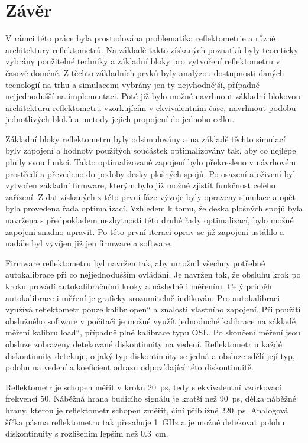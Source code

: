 \chapter{Závěr}

V rámci této práce byla prostudována problematika reflektometrie a různé architektury reflektometrů. Na základě takto získaných poznatků byly teoreticky vybrány použitelné techniky a základní bloky pro vytvoření reflektometru v časové doméně. Z těchto základních prvků byly analýzou dostupnosti daných tecnologií na trhu a simulacemi vybrány jen ty nejvhodnější, případně nejjednodušší na implementaci. Poté již bylo možné navrhnout základní blokovou architekturu reflektometru vzorkujícím v ekvivalentním čase, navrhnout podobu jednotlivých bloků a metody jejich propojení do jednoho celku. 

Základní bloky reflektometru byly odsimulovány a na základě těchto simulací byly zapojení a hodnoty použitých součástek optimalizovány tak, aby co nejlépe plnily svou funkci. Takto optimalizované zapojení bylo překresleno v návrhovém prostředí a převedeno do podoby desky plošných spojů. Po osazení a oživení byl vytvořen základní firmware, kterým bylo již možné zjistit funkčnost celého zařízení. Z dat získaných z této první fáze vývoje byly opraveny simulace a opět byla provedena řada optimalizací. Vzhledem k tomu, že deska plošných spojů byla navržena s předpokladem nezbytnosti této druhé řady optimalizací, bylo možné zapojení snadno upravit. Po této první iteraci oprav se již zapojení ustálilo a nadále byl vyvíjen již jen firmware a software.

Firmware reflektometru byl navržen tak, aby umožnil všechny potřebné autokalibrace při co nejjednodušším ovládání. Je navržen tak, že obsluhu krok po kroku provádí autokalibračními kroky a následně i měřením. Celý průběh autokalibrace i měření je graficky srozumitelně indikován. Pro autokalibraci využívá reflektometr pouze kalibr \quotedblbase open\textquotedblleft{} a znalosti vlastního zapojení. Při použití obslužného software v počítači je možné využít jednoduché kalibrace na základě měření kalibru \quotedblbase load\textquotedblleft , případně plné kalibrace typu OSL. Po skončení měření jsou obsluze zobrazeny detekované diskontinuity na vedení. Reflektometr u každé diskontinuity detekuje, o jaký typ diskontinuity se jedná a obsluze sdělí její typ, polohu na vedení a koeficient odrazu odpovídající této diskontinuitě.

Reflektometr je schopen měřit v kroku \SI{20}{\pico\second}, tedy s ekvivalentní vzorkovací frekvencí \SI{50}{\gigasample}. Náběžná hrana budicího signálu je kratší než \SI{90}{\pico\second}, délka náběžné hrany, kterou je reflektometr schopen změřit, činí přibližně \SI{220}{\pico\second}. Analogová šířka pásma reflektometru tak přesahuje \SI{1}{\giga\hertz} a je možné detekovat polohu diskontinuity s rozlišením lepším než \SI{0.3}{\centi\meter}.


